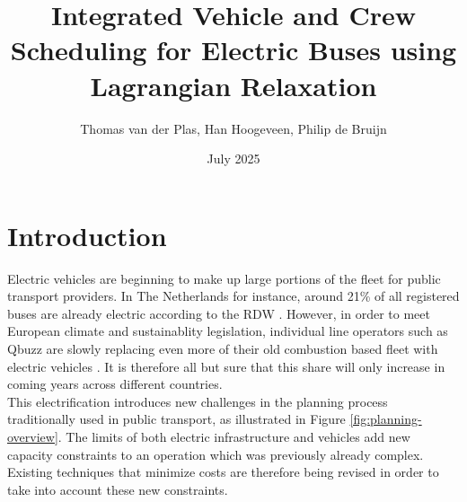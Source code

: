 \documentclass[]{article}
\title{Integrated Vehicle and Crew Scheduling for Electric Buses using Lagrangian Relaxation}
\date{July 2025}
\author{Thomas van der Plas, Han Hoogeveen, Philip de Bruijn}
\begin{document}
\maketitle

\section{Introduction}
Electric vehicles are beginning to make up large portions of the fleet for public transport providers. In
The Netherlands for instance, around 21\% of all registered buses are already electric
according to the RDW \cite{RDW}. However, in order to meet European climate and
sustainablity legislation, individual line operators such as Qbuzz are slowly
replacing even more of their old combustion based fleet with electric vehicles
\cite{europaRegulation20181999, qbuzzQbuzz}. It is therefore all but sure that this
share will only increase in coming years across different countries. \\
This electrification introduces new challenges in the planning process traditionally used in public transport, as illustrated in Figure \ref{fig:planning-overview}. The limits of both electric infrastructure and vehicles add new capacity constraints to an operation which was previously already complex. Existing techniques that minimize costs are therefore being revised in order
to take into account these new constraints. \\\\ 
\end{document}
